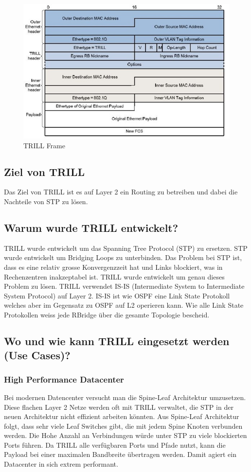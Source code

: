 \begin{figure}[h]
\centering
\includegraphics[width=0.6\linewidth]{images/trill_header}
\caption{TRILL Frame}
\label{fig:trillheader}
\end{figure}

\subsection{Ziel von TRILL} %
Das Ziel von TRILL ist es auf Layer 2 ein Routing zu betreiben und dabei die Nachteile von STP zu lösen.

\subsection{Warum wurde TRILL entwickelt?} %
TRILL wurde entwickelt um das Spanning Tree Protocol (STP) zu ersetzen. STP wurde entwickelt um Bridging Loops zu unterbinden. Das Problem bei STP ist, dass es eine relativ grosse Konvergenzzeit hat und Links blockiert, was in Rechenzentren inakzeptabel ist. TRILL wurde entwickelt um genau dieses Problem zu lösen. TRILL verwendet IS-IS (Intermediate System to Intermediate System Protocol) auf Layer 2. IS-IS ist wie OSPF eine Link State Protokoll welches aber im Gegensatz zu OSPF auf L2 operieren kann. Wie alle Link State Protokollen weiss jede RBridge über die gesamte Topologie bescheid. 

\subsection{Wo und wie kann TRILL eingesetzt werden (Use Cases)?} %


\subsubsection{High Performance Datacenter}
Bei modernen Datencenter versucht man die Spine-Leaf Architektur umzusetzen. Diese flachen Layer 2 Netze werden oft mit TRILL verwaltet, die STP in der neuen Architektur nicht effizient arbeiten könnten. Aus Spine-Leaf Architektur folgt, dass sehr viele Leaf Switches gibt, die mit jedem Spine Knoten verbunden werden. Die Hohe Anzahl an Verbindungen würde unter STP zu viele blockierten Ports führen.  Da TRILL alle verfügbaren Ports und Pfade nutzt, kann die Payload bei einer maximalen Bandbreite übertragen werden. Damit agiert ein Datacenter in sich extrem performant. 

